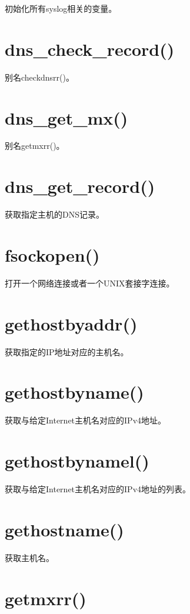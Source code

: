 初始化所有syslog相关的变量。

\section{dns\_check\_record()}

别名checkdnsrr()。

\section{dns\_get\_mx()}

别名getmxrr()。

\section{dns\_get\_record()}

获取指定主机的DNS记录。

\section{fsockopen()}

打开一个网络连接或者一个UNIX套接字连接。

\section{gethostbyaddr()}

获取指定的IP地址对应的主机名。

\section{gethostbyname()}

获取与给定Internet主机名对应的IPv4地址。

\section{gethostbynamel()}

获取与给定Internet主机名对应的IPv4地址的列表。

\section{gethostname()}

获取主机名。

\section{getmxrr()}

